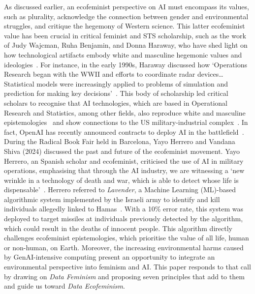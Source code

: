 As discussed earlier, an ecofeminist perspective on AI must encompass its values, such as plurality, acknowledge the connection between gender and environmental struggles, and critique the hegemony of Western science. This latter ecofeminist value has been crucial in critical feminist and STS scholarship, such as the work of Judy Wajcman, Ruha Benjamin, and Donna Haraway, who have shed light on how technological artifacts embody white and masculine hegemonic values and ideologies~\cite{Wajcman1991, benjamin2019race, haraway1991simians}. For instance, in the early 1990s, Haraway discussed how `Operations Research began with the WWII and efforts to coordinate radar devices… Statistical models were increasingly applied to problems of simulation and prediction for making key decisions'~\cite[p. 58]{haraway1991simians}. This body of scholarship led critical scholars to recognise that AI technologies, which are based in Operational Research and Statistics, among other fields, also reproduce white and masculine epistemologies~\cite{gebru2024tescreal, benjamin2019race, crawford2016white_guy, birhane2022values, bolukbasi2016debiasing} and show connections to the US military-industrial complex~\cite{Katz2020, TheNewYorkTimes2021}. In fact, OpenAI has recently announced contracts to deploy AI in the battlefield~\cite{MITTechReview2024}. During the Radical Book Fair held in Barcelona, Yayo Herrero and Vandana Shiva (2024) discussed the past and future of the ecofeminist movement. Yayo Herrero, an Spanish scholar and ecofeminist, criticised the use of AI in military operations, emphasising that through the AI industry, we are witnessing a `new wrinkle in a technology of death and war, which is able to detect whose life is dispensable'~\cite{ShivaHerrero2024}. Herrero referred to \textit{Lavender}, a Machine Learning (ML)-based algorithmic system implemented by the Israeli army to identify and kill individuals allegedly linked to Hamas~\cite{abraham2024lavender}. With a 10\% error rate, this system was deployed to target missiles at individuals previously detected by the algorithm, which could result in the deaths of innocent people. This algorithm directly challenges ecofeminist epistemologies, which prioritise the value of all life, human or non-human, on Earth. Moreover, the increasing environmental harms caused by GenAI-intensive computing present an opportunity to integrate an environmental perspective into feminism and AI. This paper responds to that call by drawing on \textit{Data Feminism} and proposing seven principles that add to them and guide us toward \textit{Data Ecofeminism}.